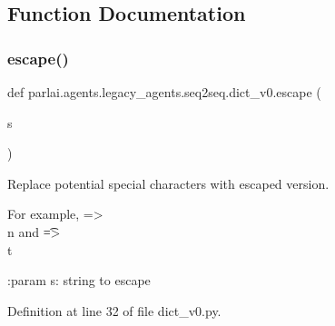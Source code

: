 \subsection{Function Documentation}
\mbox{\label{namespaceparlai_1_1agents_1_1legacy__agents_1_1seq2seq_1_1dict__v0_a50d891f5daa90cde2858723889ab0cc8}} 
\subsubsection{\texorpdfstring{escape()}{escape()}}
{\footnotesize\ttfamily def parlai.\+agents.\+legacy\+\_\+agents.\+seq2seq.\+dict\+\_\+v0.\+escape (\begin{DoxyParamCaption}\item[{}]{s }\end{DoxyParamCaption})}

\begin{DoxyVerb}Replace potential special characters with escaped version.

For example, \n => \\n and \t => \\t

:param s: string to escape
\end{DoxyVerb}
 

Definition at line 32 of file dict\+\_\+v0.\+py.


